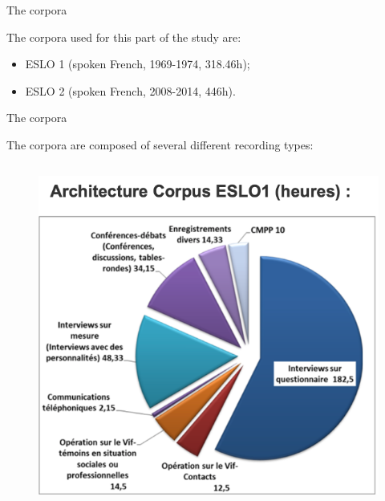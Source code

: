 \documentclass[lesson_slides]{subfiles}
\begin{document}
\begin{frame}[c]{The corpora}

    \noindent The corpora used for this part of the study are: \pause

    \begin{itemize}
        \item[\ding{227}] ESLO 1 (spoken French, 1969-1974, 318.46h); \pause
        \item[\ding{227}] ESLO 2 (spoken French, 2008-2014, 446h).
    \end{itemize}
    
\end{frame}
\begin{frame}[c]{The corpora}

    \noindent The corpora are composed of several different recording types: \pause

\begin{columns}
        \begin{figure}
        \centering
        \includegraphics[width=\textwidth]{images/eslo1.png}
        \end{figure}

    \end{columns}
    
\end{frame}
\end{document}
